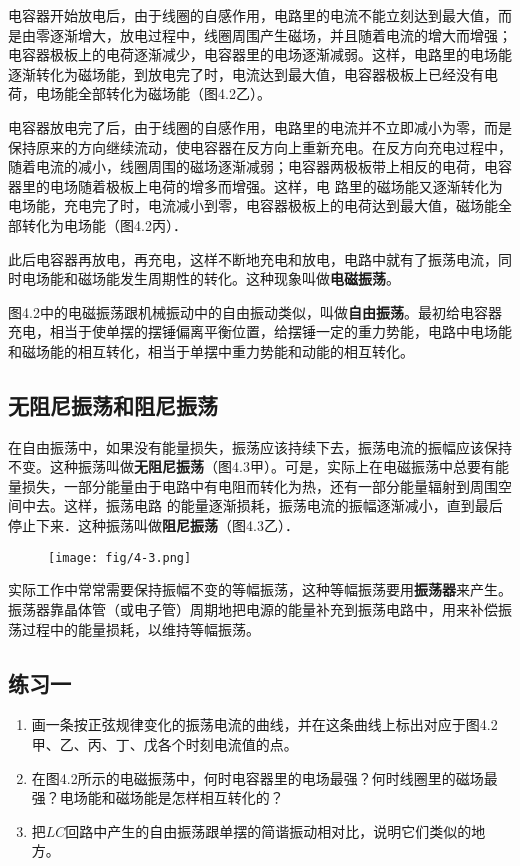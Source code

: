 电容器开始放电后，由于线圈的自感作用，电路里的电流不能立刻达到最大值，而是由零逐渐增大，放电过程中，线圈周围产生磁场，并且随着电流的增大而增强；电容器极板上的电荷逐渐减少，电容器里的电场逐渐减弱。这样，电路里的电场能逐渐转化为磁场能，到放电完了时，电流达到最大值，电容器极板上已经没有电荷，电场能全部转化为磁场能（图4.2乙）。


电容器放电完了后，由于线圈的自感作用，电路里的电流并不立即减小为零，而是保持原来的方向继续流动，使电容器在反方向上重新充电。在反方向充电过程中，随着电流的减小，线圈周围的磁场逐渐减弱；电容器两极板带上相反的电荷，电容器里的电场随着极板上电荷的增多而增强。这样，电
路里的磁场能又逐渐转化为电场能，充电完了时，电流减小到零，电容器极板上的电荷达到最大值，磁场能全部转化为电场能（图4.2丙）．

此后电容器再放电，再充电，这样不断地充电和放电，电路中就有了振荡电流，同时电场能和磁场能发生周期性的转化。这种现象叫做\textbf{电磁振荡}。

图4.2中的电磁振荡跟机械振动中的自由振动类似，叫做\textbf{自由振荡}。最初给电容器充电，相当于使单摆的摆锤偏离平衡位置，给摆锤一定的重力势能，电路中电场能和磁场能的相互转化，相当于单摆中重力势能和动能的相互转化。

\subsection{无阻尼振荡和阻尼振荡}

在自由振荡中，如果没有能量损失，振荡应该持续下去，振荡电流的振幅应该保持不变。这种振荡叫做\textbf{无阻尼振荡}（图4.3甲）。可是，实际上在电磁振荡中总要有能量损失，一部分能量由于电路中有电阻而转化为热，还有一部分能量辐射到周围空间中去。这样，振荡电路
的能量逐渐损耗，振荡电流的振幅逐渐减小，直到最后停止下来．这种振荡叫做\textbf{阻尼振荡}（图4.3乙）．
\begin{figure}[htp]\centering
\texttt{[image: fig/4-3.png]}
\caption{}
\end{figure}

实际工作中常常需要保持振幅不变的等幅振荡，这种等幅振荡要用\textbf{振荡器}来产生。振荡器靠晶体管（或电子管）周期地把电源的能量补充到振荡电路中，用来补偿振荡过程中的能量损耗，以维持等幅振荡。

\subsection*{练习一}
\begin{enumerate}
	\item 画一条按正弦规律变化的振荡电流的曲线，并在这条曲线上标出对应于图4.2甲、乙、丙、丁、戊各个时刻电流值的点。
	\item 在图4.2所示的电磁振荡中，何时电容器里的电场最强？何时线圈里的磁场最强？电场能和磁场能是怎样相互转化的？
	\item 把$LC$回路中产生的自由振荡跟单摆的简谐振动相对比，说明它们类似的地方。
\end{enumerate}


